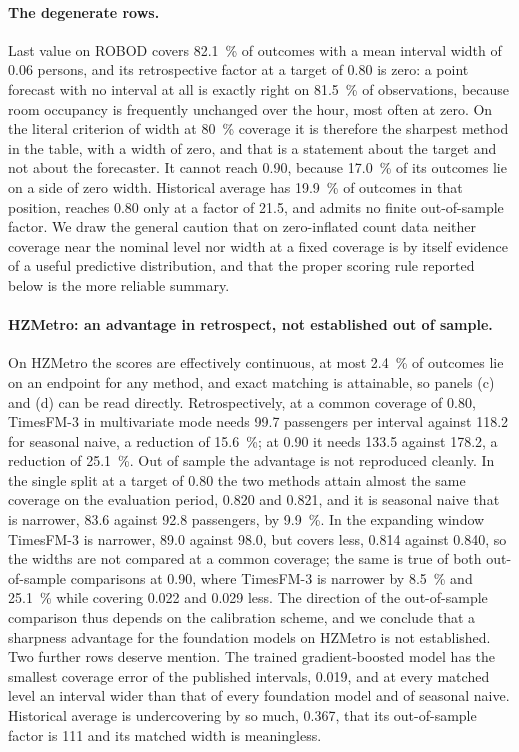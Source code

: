 \documentclass[utf8]{FrontiersinHarvard}
\newif\ifsecondrevisionmarkup
\newcommand{\rev}[1]{\ifsecondrevisionmarkup\textcolor{revisiontwo}{#1}\else#1\fi}
\theoremstyle{plain}
\theoremstyle{definition}
\theoremstyle{remark}
\begin{document}
\rev{\paragraph{The degenerate rows.} Last value on ROBOD covers \SI{82.1}{\percent} of outcomes with a mean interval width of \num{0.06} persons, and its retrospective factor at a target of \num{0.80} is zero: a point forecast with no interval at all is exactly right on \SI{81.5}{\percent} of observations, because room occupancy is frequently unchanged over the hour, most often at zero. On the literal criterion of width at \SI{80}{\percent} coverage it is therefore the sharpest method in the table, with a width of zero, and that is a statement about the target and not about the forecaster. It cannot reach \num{0.90}, because \SI{17.0}{\percent} of its outcomes lie on a side of zero width. Historical average has \SI{19.9}{\percent} of outcomes in that position, reaches \num{0.80} only at a factor of \num{21.5}, and admits no finite out-of-sample factor. We draw the general caution that on zero-inflated count data neither coverage near the nominal level nor width at a fixed coverage is by itself evidence of a useful predictive distribution, and that the proper scoring rule reported below is the more reliable summary.}

\rev{\paragraph{HZMetro: an advantage in retrospect, not established out of sample.} On HZMetro the scores are effectively continuous, at most \SI{2.4}{\percent} of outcomes lie on an endpoint for any method, and exact matching is attainable, so panels (c) and (d) can be read directly. Retrospectively, at a common coverage of \num{0.80}, TimesFM-3 in multivariate mode needs \num{99.7} passengers per interval against \num{118.2} for seasonal naive, a reduction of \SI{15.6}{\percent}; at \num{0.90} it needs \num{133.5} against \num{178.2}, a reduction of \SI{25.1}{\percent}. Out of sample the advantage is not reproduced cleanly. In the single split at a target of \num{0.80} the two methods attain almost the same coverage on the evaluation period, \num{0.820} and \num{0.821}, and it is seasonal naive that is narrower, \num{83.6} against \num{92.8} passengers, by \SI{9.9}{\percent}. In the expanding window TimesFM-3 is narrower, \num{89.0} against \num{98.0}, but covers less, \num{0.814} against \num{0.840}, so the widths are not compared at a common coverage; the same is true of both out-of-sample comparisons at \num{0.90}, where TimesFM-3 is narrower by \SI{8.5}{\percent} and \SI{25.1}{\percent} while covering \num{0.022} and \num{0.029} less. The direction of the out-of-sample comparison thus depends on the calibration scheme, and we conclude that a sharpness advantage for the foundation models on HZMetro is not established. Two further rows deserve mention. The trained gradient-boosted model has the smallest coverage error of the published intervals, \num{0.019}, and at every matched level an interval wider than that of every foundation model and of seasonal naive. Historical average is undercovering by so much, \num{0.367}, that its out-of-sample factor is \num{111} and its matched width is meaningless.}
\end{document}
